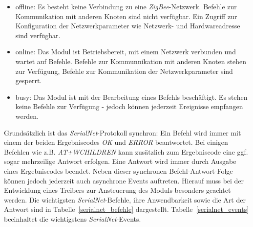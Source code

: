                 \begin{itemize}
                    \item{offline:} Es besteht keine Verbindung zu eine \emph{ZigBee}-Netzwerk. Befehle
                                    zur Kommunikation mit anderen Knoten sind nicht verfügbar. 
                                    Ein Zugriff zur Konfiguration der Netzwerkparameter wie 
                                    Netzwerk- und Hardwareadresse sind verfügbar. 

                    \item{online:} Das Modul ist Betriebsbereit, mit einem Netzwerk verbunden und wartet
                                   auf Befehle. Befehle zur Kommunnikation mit anderen Knoten stehen zur
                                   Verfügung, Befehle zur Kommunikation der Netzwerkparameter sind gesperrt.

                    \item{busy:} Das Modul ist mit der Bearbeitung eines Befehls beschäftigt. Es stehen
                                 keine Befehle zur Verfügung - jedoch können jederzeit Ereignisse 
                                 empfangen werden.
                \end{itemize}
                                    
                Grundsätzlich ist das \emph{SerialNet}-Protokoll synchron: Ein Befehl wird immer mit einem der beiden 
                Ergebniscodes \emph{OK} und \emph{ERROR} beantwortet. Bei einigen Befehlen wie z.B. \emph{AT+WCHILDREN}
                kann zusätzlich zum Ergebniscode eine ggf. sogar mehrzeilige Antwort erfolgen. Eine Antwort wird immer
                durch Ausgabe eines Ergebniscodes beendet. Neben dieser synchronen Befehl-Antwort-Folge können jedoch
                jederzeit auch asynchrone Events auftreten. Hierauf muss bei der Entwicklung eines Treibers zur 
                Ansteuerung des Moduls besonders geachtet werden. Die wichtigsten \emph{SerialNet}-Befehle, ihre
                Anwendbarkeit sowie die Art der Antwort sind in Tabelle~\ref{serialnet_befehle} dargestellt.
                Tabelle~\ref{serialnet_events} beeinhaltet die wichtigstens \emph{SerialNet}-Events.

